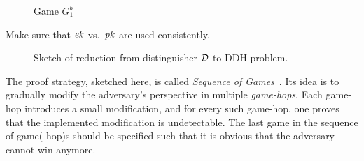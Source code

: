 \begin{figure}[!ht]
    \centering
    \begin{minipage}{0.49\textwidth}
        \centering
        
        \caption{Game $\INDCPA_\PKE^b$}
        \label{fig:elgamal:ind}
    \end{minipage}
    \hfill
    \begin{minipage}{0.49\textwidth}
        \centering
        
        \caption{Game $G_1^b$}
        \label{fig:elgamal:g1}
    \end{minipage}
\end{figure}

\alert{Make sure that $\mathit{ek}$ vs.\ $\mathit{pk}$ are used consistently.}

\begin{figure}[!ht]
    \centering
    
    \caption{Sketch of reduction from distinguisher $\mathcal{D}$ to DDH problem.}
    \label{fig:elgamal:reduction}
\end{figure}

The proof strategy, sketched here, is called \emph{Sequence of Games}~\cite{EPRINT:Shoup04}.
Its idea is to gradually modify the adversary's perspective in multiple \emph{game-hops}.
Each game-hop introduces a small modification, and for every such game-hop, one proves that the implemented modification is undetectable.
The last game in the sequence of game(-hop)s should be specified such that it is obvious that the adversary cannot win anymore.